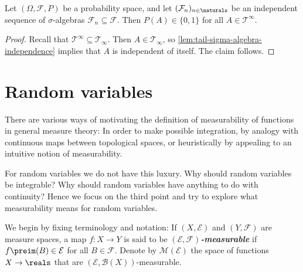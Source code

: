 \documentclass[article, a4paper, 11pt, oneside]{memoir}
\numberwithin{equation}{chapter}
\newcommand{\calT}{\mathcal{T}}
\newcommand{\calB}{\mathcal{B}}
\newcommand{\calE}{\mathcal{E}}
\newcommand{\calF}{\mathcal{F}}
\newcommand{\borel}[1]{\calB(#1)}
\newcommand{\keyword}[1]{{\itshape\bfseries #1}}
\begin{document}
\begin{theorem}
    Let $(\Omega,\calF,P)$ be a probability space, and let $(\calF_n)_{n \in \naturals}$ be an independent sequence of $\sigma$-algebras $\calF_n \subseteq \calF$. Then $P(A) \in \{0,1\}$ for all $A \in \calT^\infty$.
\end{theorem}

\begin{proof}
    Recall that $\calT^\infty \subseteq \calT_\infty$. Then $A \in \calT_\infty$, so \cref{lem:tail-sigma-algebra-independence} implies that $A$ is independent of itself. The claim follows.
\end{proof}



\section{Random variables}

\newcommand{\meas}[1]{\mathcal{M}(#1)}
\newcommand{\simplemeas}[1]{\mathcal{S\!M}(#1)}

There are various ways of motivating the definition of measurability of functions in general measure theory: In order to make possible integration, by analogy with continuous maps between topological spaces, or heuristically by appealing to an intuitive notion of measurability.

For random variables we do not have this luxury. Why should random variables be integrable? Why should random variables have anything to do with continuity? Hence we focus on the third point and try to explore what measurability means for random variables.

We begin by fixing terminology and notation: If $(X,\calE)$ and $(Y,\calF)$ are measure spaces, a map $f \colon X \to Y$ is said to be \keyword{$(\calE,\calF)$-measurable} if $f\preim(B) \in \calE$ for all $B \in \calF$. Denote by $\meas{\calE}$ the space of functions $X \to \reals$ that are $(\calE,\borel{X})$-measurable.
\end{document}
